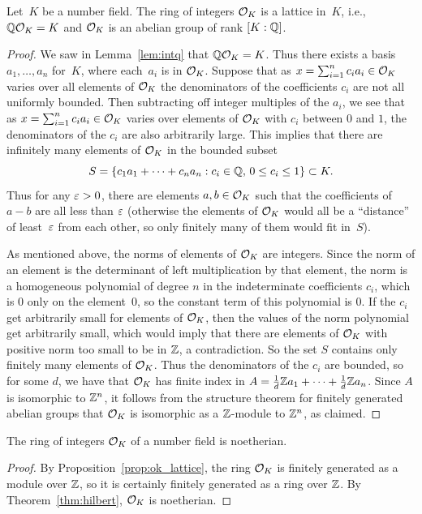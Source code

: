 \begin{proposition}\label{prop:ok_lattice}
	Let~$K$ be a number field.  The ring of integers $\mathcal{O}_K$ is a
	lattice in~$K$, i.e., $\mathbb{Q}\mathcal{O}_K=K$ and $\mathcal{O}_K$ is an abelian group
	of rank $[K:\mathbb{Q}]$.
\end{proposition}
\begin{proof}
	We saw in Lemma~\ref{lem:intq} that $\mathbb{Q}\mathcal{O}_K=K$.  Thus there exists a
	basis $a_1,\ldots, a_n$ for~$K$, where each~$a_i$ is in $\mathcal{O}_K$.
	Suppose that as $x=\sum_{i=1}^n c_i a_i\in \mathcal{O}_K$ varies over all
	elements of $\mathcal{O}_K$ the denominators of the coefficients $c_i$ are not
	all uniformly bounded.  Then subtracting off integer multiples of the
	$a_i$, we see that as $x=\sum_{i=1}^n c_i a_i\in \mathcal{O}_K$ varies over
	elements of $\mathcal{O}_K$ with $c_i$ between $0$ and $1$, the denominators of
	the $c_i$ are also arbitrarily large.  This implies that there are
	infinitely many elements of $\mathcal{O}_K$ in the bounded subset
	$$
		S = \left\{
			c_1 a_1 +\cdots + c_n a_n : c_i \in \mathbb{Q},\, 0\leq c_i \leq 1
		\right\} \subset K.
	$$
	Thus for any $\varepsilon>0$, there are elements $a,b\in \mathcal{O}_K$ such that the
	coefficients of $a-b$ are all less than $\varepsilon$ (otherwise the elements
	of $\mathcal{O}_K$ would all be a ``distance''
	of least~$\varepsilon$ from each other, so only finitely
	many of them would fit in~$S$).
	
	As mentioned above, the norms of elements of $\mathcal{O}_K$ are integers.
	Since the norm of an element is the determinant of left multiplication
	by that element, the norm is a homogeneous polynomial of degree $n$ in
	the indeterminate coefficients $c_i$, which is $0$ only on the
	element~$0$, so the constant term of this polynomial is $0$.
	If the $c_i$ get arbitrarily small for elements of
	$\mathcal{O}_K$, then the values of the norm polynomial get arbitrarily small,
	which would imply that there are elements of $\mathcal{O}_K$ with positive norm
	too small to be in $\mathbb{Z}$, a contradiction.  So the set $S$ contains
	only finitely many elements of $\mathcal{O}_K$.  Thus the denominators of the
	$c_i$ are bounded, so for some $d$, we have that $\mathcal{O}_K$ has finite
	index in $A=\frac{1}{d}\mathbb{Z} a_1 + \cdots + \frac{1}{d}\mathbb{Z} a_n$.  Since
	$A$ is isomorphic to $\mathbb{Z}^n$, it follows from the structure theorem for
	finitely generated abelian groups that $\mathcal{O}_K$ is isomorphic as a
	$\mathbb{Z}$-module to $\mathbb{Z}^n$, as claimed.
\end{proof}

\begin{corollary}\label{prop:intnoetherian}
	The ring of integers $\mathcal{O}_K$ of a number field is noetherian.
\end{corollary}
\begin{proof}
	By Proposition~\ref{prop:ok_lattice}, the ring $\mathcal{O}_K$ is
	finitely generated as a module over $\mathbb{Z}$, so it is certainly
	finitely generated as a ring over $\mathbb{Z}$.
	By Theorem~\ref{thm:hilbert}, $\mathcal{O}_K$ is noetherian.
\end{proof}


